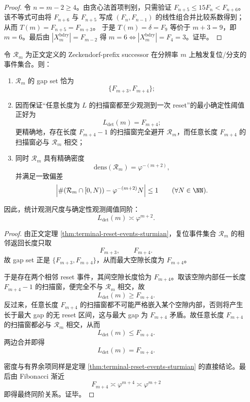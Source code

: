 \begin{proof}
令 \(n=m-2\ge 4\)。由贪心法首项判别，只需验证
\(
F_{n+5}\le 15F_n< F_{n+6}
\)。
该不等式可由将 \(F_{n+6}\) 与 \(F_{n+5}\) 写成 \((F_n,F_{n-1})\) 的线性组合并比较系数得到；从而 \(T(m)=F_{n+5}=F_{m+3}\)。
于是 \(T(m)=\delta=F_9\) 等价于 \(m+3=9\)，即 \(m=6\)。最后由 \(|X_m^{\mathrm{bdry}}|=F_{m-2}\) 得 \(m=6\iff |X_m^{\mathrm{bdry}}|=F_4=3\)。证毕。
\end{proof}

\begin{theorem}\label{thm:conclusion-zeckendorf-reset-observation-threshold}
令 \(\mathcal R_m\) 为正文定义的 Zeckendorf-prefix successor 在分辨率 \(m\) 上触发复位/分支的事件集合。则：
\begin{enumerate}
  \item \(\mathcal R_m\) 的 gap set 恰为
  \[
  \{F_{m+3},F_{m+4}\};
  \]
  \item 因而保证“任意长度为 \(L\) 的扫描窗都至少观测到一次 reset”的最小确定性阈值正好为
  \[
  L_{\mathrm{det}}(m)=F_{m+4};
  \]
  更精确地，存在长度 \(F_{m+4}-1\) 的扫描窗完全避开 \(\mathcal R_m\)，而任意长度 \(F_{m+4}\) 的扫描窗必与 \(\mathcal R_m\) 相交；
  \item 同时 \(\mathcal R_m\) 具有精确密度
  \[
  \mathrm{dens}(\mathcal R_m)=\varphi^{-(m+2)},
  \]
  并满足一致偏差
  \[
  \Bigl|\#(\mathcal R_m\cap[0,N))-\varphi^{-(m+2)}N\Bigr|\le 1
  \qquad(\forall N\in\NN).
  \]
\end{enumerate}
因此，统计观测尺度与确定性观测阈值同阶：
\[
L_{\mathrm{det}}(m)\asymp \varphi^{m+2}.
\]
\end{theorem}

\begin{proof}
由正文定理 \ref{thm:terminal-reset-events-sturmian}，复位事件集合 \(\mathcal R_m\) 的相邻返回长度只取
\[
F_{m+3},\qquad F_{m+4}.
\]
故 gap set 正是 \(\{F_{m+3},F_{m+4}\}\)，从而最大空隙长度为 \(F_{m+4}\)。

于是存在两个相邻 reset 事件，其间空隙长度恰为 \(F_{m+4}\)。取该空隙内部任一长度 \(F_{m+4}-1\) 的扫描窗，便完全不与 \(\mathcal R_m\) 相交，故
\[
L_{\mathrm{det}}(m)\ge F_{m+4}.
\]
反过来，任意长度 \(F_{m+4}\) 的扫描窗都不可能严格嵌入某个空隙内部，否则将产生长于最大 gap 的无 reset 区间，这与最大 gap 为 \(F_{m+4}\) 矛盾。故任意长度 \(F_{m+4}\) 的扫描窗都必与 \(\mathcal R_m\) 相交，从而
\[
L_{\mathrm{det}}(m)\le F_{m+4}.
\]
两边合并即得
\[
L_{\mathrm{det}}(m)=F_{m+4}.
\]

密度与有界余项同样是定理 \ref{thm:terminal-reset-events-sturmian} 的直接结论。最后由 Fibonacci 渐近
\[
F_{m+4}\asymp \varphi^{m+4}\asymp \varphi^{m+2}
\]
即得最终同阶关系。证毕。
\end{proof}

